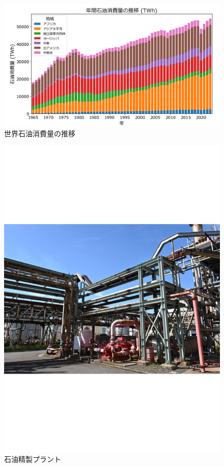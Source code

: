 \documentclass[../main]{subfiles}
\begin{document}
\begin{figure}[t]
  \centering
  \includegraphics[keepaspectratio, width=1.0\linewidth]{chap1/oil_consumption.png}
  \caption{世界石油消費量の推移}
  \label{fig:oil_consumption}
\end{figure}

\begin{figure}[t]
  \centering
  \includegraphics[keepaspectratio, width=1.0\linewidth]{chap1/view_plant.pdf}
  \caption{石油精製プラント}
  \label{fig:view_plant}
\end{figure}
\end{document}
